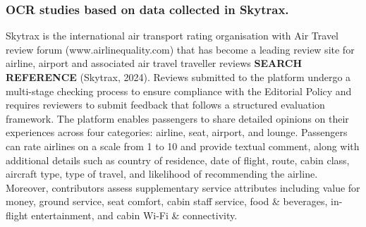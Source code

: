 \documentclass[
]{agujournal2019}
\begin{document}
\subsubsection{OCR studies based on data collected in
Skytrax.}\label{ocr-studies-based-on-data-collected-in-skytrax.}

Skytrax is the international air transport rating organisation with Air
Travel review forum (www.airlinequality.com) that has become a leading
review site for airline, airport and associated air travel traveller
reviews \textbf{SEARCH REFERENCE} (Skytrax, 2024). Reviews submitted to
the platform undergo a multi-stage checking process to ensure compliance
with the Editorial Policy and requires reviewers to submit feedback that
follows a structured evaluation framework. The platform enables
passengers to share detailed opinions on their experiences across four
categories: airline, seat, airport, and lounge. Passengers can rate
airlines on a scale from 1 to 10 and provide textual comment, along with
additional details such as country of residence, date of flight, route,
cabin class, aircraft type, type of travel, and likelihood of
recommending the airline. Moreover, contributors assess supplementary
service attributes including value for money, ground service, seat
comfort, cabin staff service, food \& beverages, in-flight
entertainment, and cabin Wi-Fi \& connectivity.
\end{document}
